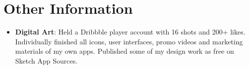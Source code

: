 \documentclass[letterpaper,11pt]{article}
\newcommand{\resumeSubHeadingListStart}{\begin{itemize}[leftmargin=*]}
\newcommand{\resumeSubHeadingListEnd}{\end{itemize}}
\begin{document}
\section{Other Information}
  \resumeSubHeadingListStart
    \item{
      \textbf{Digital Art}{: Held a Dribbble player account with 16 shots and 200+ likes. Individually finished all icons, user interfaces, promo videos and marketing materials of my own apps. Published some of my  design work as free on Sketch App Sources.}
    }
  \resumeSubHeadingListEnd

\end{document}
